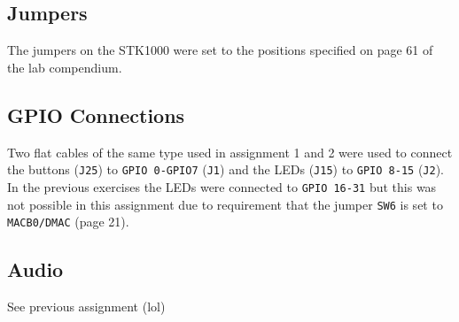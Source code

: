 \subsection{Jumpers}
	The jumpers on the STK1000 were set to the positions specified on page 61 of the lab compendium\cite{lab-compendium}.
\subsection{GPIO Connections}
	Two flat cables of the same type used in assignment 1\cite{tdt4258-1} and 2\cite{tdt4258-2} were used to connect the buttons (\texttt{J25}) to \texttt{GPIO 0-GPIO7} (\texttt{J1}) and the LEDs (\texttt{J15}) to \texttt{GPIO 8-15} (\texttt{J2}).
	In the previous exercises the LEDs were connected to \texttt{GPIO 16-31} but this was not possible in this assignment due to requirement that the jumper \texttt{SW6} is set to 
	\texttt{MACB0/DMAC}\cite{lab-compendium} (page 21).
\subsection{Audio}
	See previous assignment (lol)